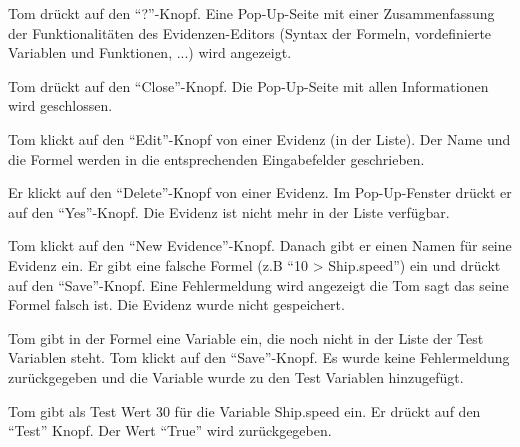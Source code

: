 \documentclass[parskip=full,11pt,twoside]{scrartcl}
\begin{document}
{Tom drückt auf den \enquote{?}-Knopf.}
{Eine Pop-Up-Seite mit einer Zusammenfassung der Funktionalitäten des Evidenzen-Editors (Syntax der Formeln, vordefinierte Variablen und Funktionen, ...) wird angezeigt.}

{Tom drückt auf den \enquote{Close}-Knopf.}
{Die Pop-Up-Seite mit allen Informationen wird geschlossen.}

{Tom klickt auf den \enquote{Edit}-Knopf von einer Evidenz (in der Liste).}
{Der Name und die Formel werden in die entsprechenden Eingabefelder geschrieben.}

{Er klickt auf den \enquote{Delete}-Knopf von einer Evidenz. Im Pop-Up-Fenster drückt er auf den \enquote{Yes}-Knopf.}
{Die Evidenz ist nicht mehr in der Liste verfügbar.}


{Tom klickt auf den \enquote{New Evidence}-Knopf. Danach gibt er einen Namen für seine Evidenz ein.
Er gibt eine falsche Formel (z.B \enquote{10 > Ship.speed}) ein und drückt auf den \enquote{Save}-Knopf.}
{Eine Fehlermeldung wird angezeigt die Tom sagt das seine Formel falsch ist. Die Evidenz wurde nicht gespeichert.}

{Tom gibt in der Formel eine Variable ein, die noch nicht in der Liste der Test Variablen steht.
Tom klickt auf den \enquote{Save}-Knopf.}
{Es wurde keine Fehlermeldung zurückgegeben und die Variable wurde zu den Test Variablen hinzugefügt.}

{Tom gibt als Test Wert 30 für die Variable Ship.speed ein. Er drückt auf den \enquote{Test} Knopf.}
{Der Wert \enquote{True} wird zurückgegeben.}
\end{document}
